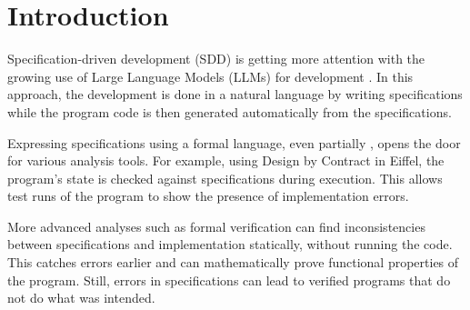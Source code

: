 \documentclass[runningheads]{llncs}
\begin{document}
\begin{abstract}
  This article introduces \toolname{}, a Language Server Protocol (LSP) implementation for the Eiffel programming language that uses Large Language Models (LLMs) to aid the development of statically verified software.
  The tool provides various interactive and non-interactive commands to produce code and specifications.
  It uses language- and project-specific knowledge to precisely direct the LLM and verifies the output using a static verifier.
  \toolname{} runs an agentic loop that fixes some errors in the LLM-generated code
  or retries the generation to avoid showing unverified output.

  The tool's bug-fixing capability for programs with contracts is evaluated on two public datasets using three models.
  Depending on the LLM and the prompt used, the tool can produce verified fixes for 76\% to 95\% of bugs.
  The results show the diminishing returns of retries: 90--96\% of successful fixes happen in the first two attempts.
  Additional knowledge in the prompt increases the success rate and decreases the time needed for fixing bugs.

\end{abstract}

\section{Introduction}
Specification-driven development (SDD) is getting more attention with the growing
use of Large Language Models (LLMs) for development \cite{10.1007/978-3-031-75434-0_9}. In this approach,
the development is done in a natural language by writing specifications while
the program code is then generated automatically
from the specifications.

Expressing specifications using a formal language, even partially \cite{meyer2022handbook},
opens the door for various analysis tools. For example,
using Design by Contract \cite{design-by-contract} in Eiffel,
the program's state is checked against specifications during execution.
This allows test runs of the program to show the presence of implementation
errors.

More advanced analyses such as formal verification can find inconsistencies between specifications and implementation statically, without running the code. This catches errors earlier and can mathematically prove functional properties of the program. Still, errors in specifications can lead to verified programs that do not do what was intended.
\end{document}
